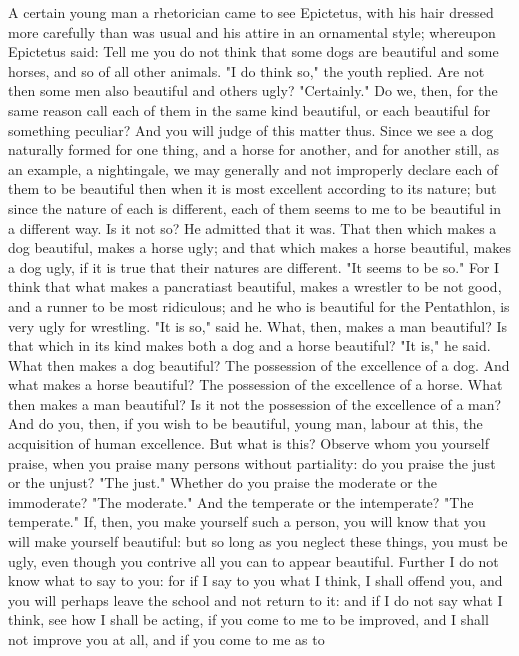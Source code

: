 \documentclass[a4paper]{article}
\begin{document}
    A certain young man a rhetorician came to see Epictetus, with his hair
dressed more carefully than was usual and his attire in an ornamental style;
whereupon Epictetus said: Tell me you do not think that some dogs are beautiful
and some horses, and so of all other animals. "I do think so," the youth
replied. Are not then some men also beautiful and others ugly? "Certainly." Do
we, then, for the same reason call each of them in the same kind beautiful, or
each beautiful for something peculiar? And you will judge of this matter thus.
Since we see a dog naturally formed for one thing, and a horse for another, and
for another still, as an example, a nightingale, we may generally and not
improperly declare each of them to be beautiful then when it is most excellent
according to its nature; but since the nature of each is different, each of
them seems to me to be beautiful in a different way. Is it not so? He admitted
that it was. That then which makes a dog beautiful, makes a horse ugly; and
that which makes a horse beautiful, makes a dog ugly, if it is true that their
natures are different. "It seems to be so." For I think that what makes a
pancratiast beautiful, makes a wrestler to be not good, and a runner to be most
ridiculous; and he who is beautiful for the Pentathlon, is very ugly for
wrestling. "It is so," said he. What, then, makes a man beautiful? Is that
which in its kind makes both a dog and a horse beautiful? "It is," he said.
What then makes a dog beautiful? The possession of the excellence of a dog. And
what makes a horse beautiful? The possession of the excellence of a horse. What
then makes a man beautiful? Is it not the possession of the excellence of a
man? And do you, then, if you wish to be beautiful, young man, labour at this,
the acquisition of human excellence. But what is this? Observe whom you
yourself praise, when you praise many persons without partiality: do you praise
the just or the unjust? "The just." Whether do you praise the moderate or the
immoderate? "The moderate." And the temperate or the intemperate? "The
temperate." If, then, you make yourself such a person, you will know that you
will make yourself beautiful: but so long as you neglect these things, you must
be ugly, even though you contrive all you can to appear beautiful.
    Further I do not know what to say to you: for if I say to you what I think,
I shall offend you, and you will perhaps leave the school and not return to it:
and if I do not say what I think, see how I shall be acting, if you come to me
to be improved, and I shall not improve you at all, and if you come to me as to
\end{document}
